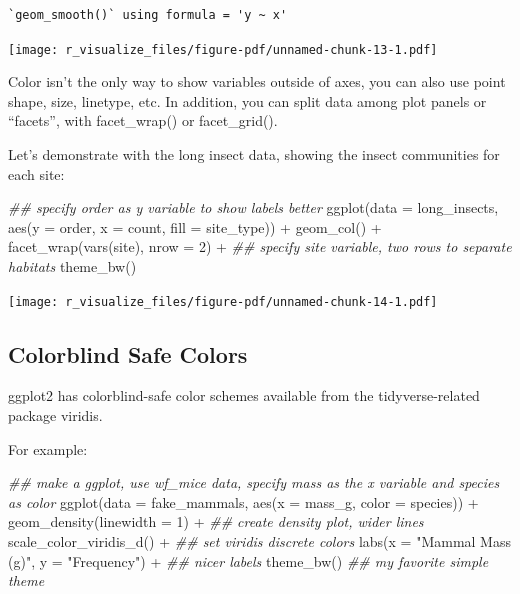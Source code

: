 \documentclass[
  letterpaper,
  DIV=11,
  numbers=noendperiod]{scrreprt}
\newenvironment{Shaded}{\begin{snugshade}}{\end{snugshade}}
\newcommand{\AttributeTok}[1]{\textcolor[rgb]{0.40,0.45,0.13}{#1}}
\newcommand{\DecValTok}[1]{\textcolor[rgb]{0.68,0.00,0.00}{#1}}
\newcommand{\DocumentationTok}[1]{\textcolor[rgb]{0.37,0.37,0.37}{\textit{#1}}}
\newcommand{\FunctionTok}[1]{\textcolor[rgb]{0.28,0.35,0.67}{#1}}
\newcommand{\NormalTok}[1]{\textcolor[rgb]{0.00,0.23,0.31}{#1}}
\newcommand{\SpecialCharTok}[1]{\textcolor[rgb]{0.37,0.37,0.37}{#1}}
\newcommand{\StringTok}[1]{\textcolor[rgb]{0.13,0.47,0.30}{#1}}
\begin{document}
\begin{verbatim}
`geom_smooth()` using formula = 'y ~ x'
\end{verbatim}

\texttt{[image: r\_visualize\_files/figure-pdf/unnamed-chunk-13-1.pdf]}

Color isn't the only way to show variables outside of axes, you can also
use point shape, size, linetype, etc. In addition, you can split data
among plot panels or ``facets'', with facet\_wrap() or facet\_grid().

Let's demonstrate with the long insect data, showing the insect
communities for each site:

\begin{Shaded}
\begin{Highlighting}[]
\DocumentationTok{\#\# specify order as y variable to show labels better}
\FunctionTok{ggplot}\NormalTok{(}\AttributeTok{data =}\NormalTok{ long\_insects, }\FunctionTok{aes}\NormalTok{(}\AttributeTok{y =}\NormalTok{ order, }\AttributeTok{x =}\NormalTok{ count, }\AttributeTok{fill =}\NormalTok{ site\_type)) }\SpecialCharTok{+}
  \FunctionTok{geom\_col}\NormalTok{() }\SpecialCharTok{+}
  \FunctionTok{facet\_wrap}\NormalTok{(}\FunctionTok{vars}\NormalTok{(site), }\AttributeTok{nrow =} \DecValTok{2}\NormalTok{) }\SpecialCharTok{+} \DocumentationTok{\#\# specify site variable, two rows to separate habitats}
  \FunctionTok{theme\_bw}\NormalTok{()}
\end{Highlighting}
\end{Shaded}

\texttt{[image: r\_visualize\_files/figure-pdf/unnamed-chunk-14-1.pdf]}

\subsection{Colorblind Safe Colors}\label{colorblind-safe-colors}

ggplot2 has colorblind-safe color schemes available from the
tidyverse-related package viridis.

For example:

\begin{Shaded}
\begin{Highlighting}[]
\DocumentationTok{\#\# make a ggplot, use wf\_mice data, specify mass as the x variable and species as color}
\FunctionTok{ggplot}\NormalTok{(}\AttributeTok{data =}\NormalTok{ fake\_mammals, }\FunctionTok{aes}\NormalTok{(}\AttributeTok{x =}\NormalTok{ mass\_g, }\AttributeTok{color =}\NormalTok{ species)) }\SpecialCharTok{+}
  \FunctionTok{geom\_density}\NormalTok{(}\AttributeTok{linewidth =} \DecValTok{1}\NormalTok{) }\SpecialCharTok{+} \DocumentationTok{\#\# create density plot, wider lines}
  \FunctionTok{scale\_color\_viridis\_d}\NormalTok{() }\SpecialCharTok{+} \DocumentationTok{\#\# set viridis discrete colors}
  \FunctionTok{labs}\NormalTok{(}\AttributeTok{x =} \StringTok{"Mammal Mass (g)"}\NormalTok{, }\AttributeTok{y =} \StringTok{"Frequency"}\NormalTok{) }\SpecialCharTok{+} \DocumentationTok{\#\# nicer labels}
  \FunctionTok{theme\_bw}\NormalTok{() }\DocumentationTok{\#\# my favorite simple theme}
\end{Highlighting}
\end{Shaded}
\end{document}
